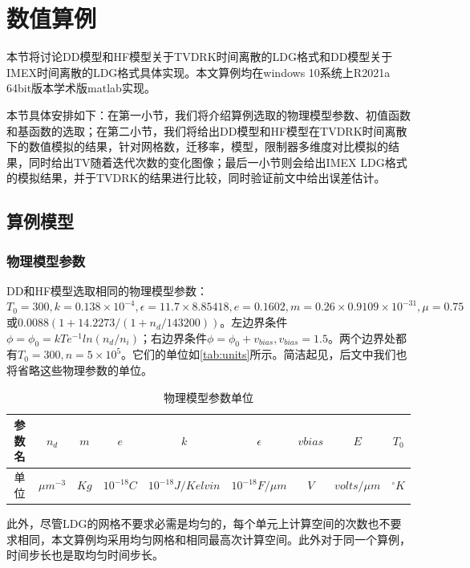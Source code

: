 \section{数值算例}
本节将讨论DD模型和HF模型关于TVDRK时间离散的LDG格式和DD模型关于IMEX时间离散的LDG格式具体实现。本文算例均在windows 10系统上R2021a 64bit版本学术版matlab实现。

本节具体安排如下：在第一小节，我们将介绍算例选取的物理模型参数、初值函数和基函数的选取；在第二小节，我们将给出DD模型和HF模型在TVDRK时间离散下的数值模拟的结果，针对网格数，迁移率，模型，限制器多维度对比模拟的结果，同时给出TV随着迭代次数的变化图像；最后一小节则会给出IMEX LDG格式的模拟结果，并于TVDRK的结果进行比较，同时验证前文中给出误差估计。
\subsection{算例模型}
\subsubsection{物理模型参数}
DD和HF模型选取相同的物理模型参数：$T_0 = 300, k = 0.138 \times 10^{-4}, \epsilon = 11.7\times 8.85418, e = 0.1602, m = 0.26\times0.9109\times 10^{-31}, \mu = 0.75 $或$0.0088(1+14.2273/(1+n_d/143200))$。左边界条件$\phi=\phi_0=kTe^{-1}ln(n_d/n_i)$；右边界条件$\phi = \phi_0+v_{bias}, v_{bias}=1.5$。两个边界处都有$T_0 = 300, n = 5\times 10^5$。它们的单位如\autoref{tab:units}所示\cite{cercignani2000deviceb}。简洁起见，后文中我们也将省略这些物理参数的单位。
\begin{table}[htbp]
    \centering
    \begin{tabular}{ccccccccc}
        \hline
        参数名 & $n_d$        & $m$  & $e$         & $k$                & $\epsilon$        & $vbias$ & $E$           & $T_0$      \\
        \hline
        单位   & $\mu m^{-3}$ & $Kg$ & $10^{-18}C$ & $10^{-18}J/Kelvin$ & $10^{-18}F/\mu m$ & $V$     & $volts/\mu m$ & $^\circ K$ \\
        \hline
    \end{tabular}
    \caption{物理模型参数单位}
    \label{tab:units}
\end{table}
此外，尽管LDG的网格不要求必需是均匀的，每个单元上计算空间的次数也不要求相同，本文算例均采用均匀网格和相同最高次计算空间。此外对于同一个算例，时间步长也是取均匀时间步长。
